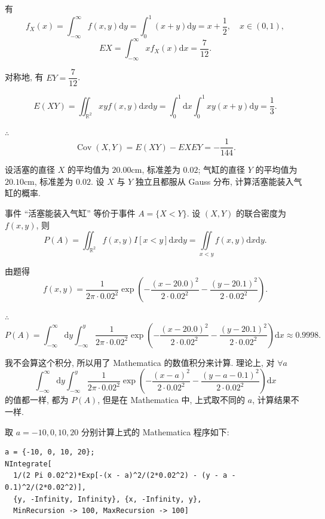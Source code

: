 \documentclass[color=black,device=normal,lang=cn]{elegantnote}
\numberwithin{equation}{section}
\theoremstyle{plain}
\numberwithin{exercise}{exsection}
\begin{document}
\begin{solution}
    有
    \[f_X(x)=\int_{-\infty}^\infty f(x,y)\mathrm{d}y=\int_0^1(x+y)\mathrm{d}y=x+\dfrac{1}{2},\quad x\in(0,1),\]
    \[EX=\int_{-\infty}^\infty xf_X(x)\mathrm{d}x=\dfrac{7}{12}.\]

    对称地, 有 $EY=\dfrac{7}{12}$.

    \[E(XY)=\iint_{\mathbb{R}^2}xyf(x,y)\mathrm{d}x\mathrm{d}y=\int_0^1\mathrm{d}x\int_0^1xy(x+y)\mathrm{d}y=\dfrac{1}{3}.\]

    $\therefore$
    \[\operatorname{Cov}(X,Y)=E(XY)-EXEY=-\dfrac{1}{144}.\]
\end{solution}
\begin{exercise}%
    设活塞的直径 $X$ 的平均值为 $20.00\text{cm}$, 标准差为 $0.02$; 气缸的直径 $Y$ 的平均值为 $20.10\text{cm}$, 标准差为 $0.02$. 设 $X$ 与 $Y$ 独立且都服从 Gauss 分布, 计算活塞能装入气缸的概率.
\end{exercise}
\begin{solution}
    事件 ``活塞能装入气缸'' 等价于事件 $A=\{X<Y\}$. 设 $(X,Y)$ 的联合密度为 $f(x,y)$, 则
    \[P(A)=\iint_{\mathbb{R}^2}f(x,y)I[x<y]\mathrm{d}x\mathrm{d}y=\iint\limits_{x<y}f(x,y)\mathrm{d}x\mathrm{d}y.\]

    由题得
    \[f(x,y)=\dfrac{1}{2\pi\cdot0.02^2}\exp\left(-\dfrac{(x-20.0)^2}{2\cdot0.02^2}-\dfrac{(y-20.1)^2}{2\cdot0.02^2}\right).\]

    $\therefore$
    \[P(A)=\int_{-\infty}^\infty\mathrm{d}y\int_{-\infty}^y\dfrac{1}{2\pi\cdot0.02^2}\exp\left(-\dfrac{(x-20.0)^2}{2\cdot0.02^2}-\dfrac{(y-20.1)^2}{2\cdot0.02^2}\right)\mathrm{d}x\approx0.9998.\]
\end{solution}
\begin{note}
    我不会算这个积分, 所以用了 Mathematica 的数值积分来计算. 理论上, 对 $\forall a$
    \[\int_{-\infty}^\infty\mathrm{d}y\int_{-\infty}^y\dfrac{1}{2\pi\cdot0.02^2}\exp\left(-\dfrac{(x-a)^2}{2\cdot0.02^2}-\dfrac{(y-a-0.1)^2}{2\cdot0.02^2}\right)\mathrm{d}x\]
    的值都一样, 都为 $P(A)$, 但是在 Mathematica 中, 上式取不同的 $a$, 计算结果不一样.

    取 $a=-10,0,10,20$ 分别计算上式的 Mathematica 程序如下:
    \begin{lstlisting}
a = {-10, 0, 10, 20};
NIntegrate[
  1/(2 Pi 0.02^2)*Exp[-(x - a)^2/(2*0.02^2) - (y - a - 0.1)^2/(2*0.02^2)],
  {y, -Infinity, Infinity}, {x, -Infinity, y},
  MinRecursion -> 100, MaxRecursion -> 100]
    \end{lstlisting}
\end{note}
\end{document}
